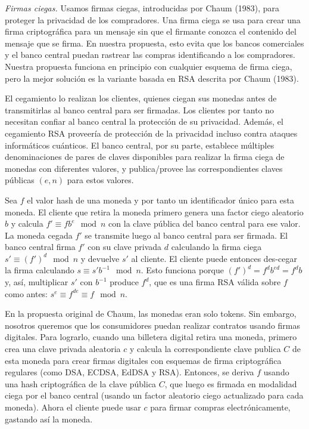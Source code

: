 \documentclass[10pt,spanish]{article}
\begin{document}
\emph{Firmas ciegas.} Usamos firmas ciegas, introducidas por Chaum
(1983), para proteger la privacidad de los compradores. Una firma ciega
se usa para crear una firma criptográfica para un mensaje sin que el
firmante conozca el contenido del mensaje que se firma. En nuestra
propuesta, esto evita que los bancos comerciales y el banco central
puedan rastrear las compras identificando a los compradores. Nuestra
propuesta funciona en principio con cualquier esquema de firma ciega,
pero la mejor solución es la variante basada en RSA descrita por Chaum
(1983).

El cegamiento lo realizan los clientes, quienes ciegan sus monedas antes
de transmitirlas al banco central para ser firmadas. Los clientes por
tanto no necesitan confiar al banco central la protección de su
privacidad. Además, el cegamiento RSA proveería de protección de la
privacidad incluso contra ataques informáticos cuánticos. El banco
central, por su parte, establece múltiples denominaciones de pares de
claves disponibles para realizar la firma ciega de monedas con
diferentes valores, y publica/provee las correspondientes claves
públicas $(e, n)$ para estos valores.

Sea $f$ el valor hash de una moneda y por tanto un identificador único
para esta moneda. El cliente que retira la moneda primero genera una
factor ciego aleatorio $b$ y calcula
$f' \equiv fb^{e} \mod n$
con la clave pública del banco central para ese valor.
La moneda cegada $f'$ se transmite luego
al banco central para ser firmada. El banco central firma $f'$ con su
clave privada $d$ calculando la firma ciega
$s' \equiv \left(f' \right)^{d} \mod n$ y devuelve
$s'$ al cliente.
El cliente puede entonces des-cegar la firma calculando
$s \equiv s'b^{- 1} \mod n$.
Esto funciona porque
$\left( f' \right)^d = f^db^{ed} = f^db$ y, así,
multiplicar $s'$ con $b^{- 1}$ produce $f^d$, que es una firma RSA
válida sobre $f$ como antes:
$s^e \equiv f^{de} \equiv f \mod n$.

En la propuesta original de Chaum, las monedas eran solo tokens. Sin
embargo, nosotros queremos que los consumidores puedan realizar
contratos usando firmas digitales. Para lograrlo, cuando una billetera
digital retira una moneda, primero crea una clave privada aleatoria
$c$ y calcula la correspondiente clave publica $C$ de esta moneda
para crear firmas digitales con esquemas de firma criptográfica
regulares (como DSA, ECDSA, EdDSA y RSA). Entonces, se deriva $f$
usando una hash criptográfica de la clave pública $C$, que luego es
firmada en modalidad ciega por el banco central (usando un factor
aleatorio ciego actualizado para cada moneda). Ahora el cliente puede
usar $c$ para firmar compras electrónicamente, gastando así la moneda.
\end{document}
